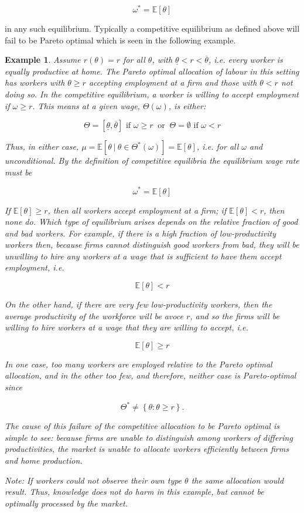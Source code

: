 \documentclass[11pt]{article}
\newtheorem{example}{Example}
\begin{document}
	$$ \omega^* = \mathbb{E} \left[ \theta \right] $$
	
in any such equilibrium. Typically a competitive equilibrium as defined above will fail to be Pareto optimal which is seen in the following example.

\begin{example}
	Assume $r(\theta) = r$ for all $\theta$, with $\underline{\theta} < r < \overline{\theta}$, i.e. every worker is equally productive at home. The Pareto optimal allocation of labour in this setting has workers with $\theta \geq r$ accepting employment at a firm and those with $\theta < r$ not doing so. In the competitive equilibrium, a worker is willing to accept employment if $\omega \geq r$. This means at a given wage, $\Theta(\omega)$, is either:
	
	$$ \Theta = \left[ \underline{\theta}, \overline{\theta} \right] \text{ if } \omega \geq r ~\text{ or }~ \Theta = \emptyset \text{ if } \omega < r $$
	
	Thus, in either case, $\mu = \mathbb{E}\left[ \theta ~|~\theta \in \Theta^*(\omega) \right] = \mathbb{E} \left[ \theta \right]$, i.e. for all $\omega$ and unconditional. By the definition of competitive equilibria  the equilibrium wage rate must be
	
		$$ \omega^* = \mathbb{E} \left[ \theta \right] $$
		
	If $\mathbb{E}[\theta] \geq r$, then all workers accept employment at a firm; if $\mathbb{E}[\theta] < r$, then none do. Which type of equilibrium arises depends on the relative fraction of good and bad workers. For example, if there is a high fraction of low-productivity workers then, because firms cannot distinguish good workers from bad, they will be unwilling to hire any workers at a wage that is sufficient to have them accept employment, i.e.
	
		$$ \mathbb{E} \left[ \theta \right] < r $$
		
	On the other hand, if there are very few low-productivity workers, then the average productivity of the workforce will be avoce $r$, and so the firms will be willing to hire workers at a wage that they are willing to accept, i.e.
		
	$$ \mathbb{E} \left[ \theta \right] \geq r $$
	
	In one case, too many workers are employed relative to the Pareto optimal allocation, and in the other too few, and therefore,  neither case is Pareto-optimal since 
	
	$$\Theta^* \neq \left\{ \theta \colon \theta \geq r \right\}. $$
	
	The cause of this failure of the competitive allocation to be Pareto optimal is simple to see: because firms are unable to distinguish among workers of differing productivities, the market is unable to allocate workers efficiently between firms and home production. ~\bigskip
	
	Note: If workers could not observe their own type $\theta$ the same allocation would result. Thus, knowledge does not do harm in this example, but cannot be optimally processed by the market.
\end{example}
\end{document}
